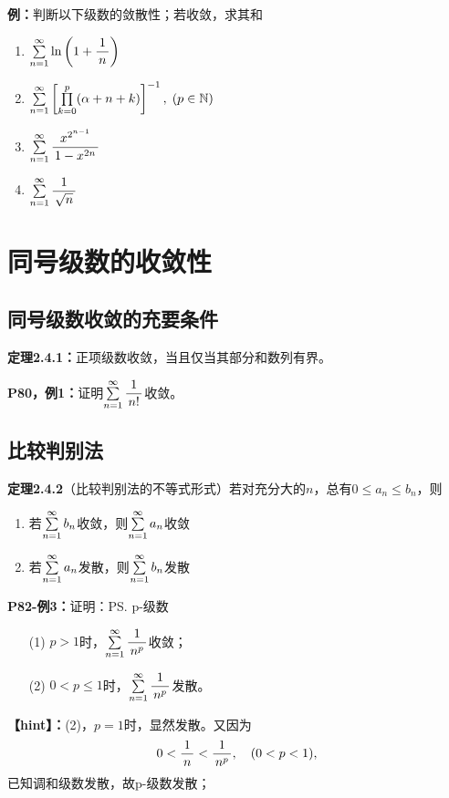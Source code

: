 {\bf 例：}判断以下级数的敛散性；若收敛，求其和

\begin{enumerate}[(1)]
  \setlength{\itemindent}{1cm}
  \item $\sumn\ln\left(1+\df 1n\right)$
  \item
  $\sumn\left[\prod\limits_{k=0}^p(\alpha+n+k)\right]^{-1},\;(p\in\mathbb{N})$
  \item $\sumn\df{x^{2^{n-1}}}{1-x^{2n}}$
  \item $\sumn\df{1}{\sqrt n}$
\end{enumerate}

\section{同号级数的收敛性}

\subsection{同号级数收敛的充要条件}

{\bf 定理2.4.1：}正项级数收敛，当且仅当其部分和数列有界。

{\bf P80，例1：}证明$\sumn\df1{n!}$收敛。

\subsection{比较判别法}

{\bf 定理2.4.2}（比较判别法的不等式形式）若对充分大的$n$，总有$0\leq a_n\leq b_n$，则
\begin{enumerate}
  \setlength{\itemindent}{1cm}
  \item 若$\sumn b_n$收敛，则$\sumn a_n$收敛
  \item 若$\sumn a_n$发散，则$\sumn b_n$发散
\end{enumerate}

{\bf P82-例3：}证明：\ps{p-级数}
\begin{enumerate}[(1)]
  \setlength{\itemindent}{1cm}
  \item[(1)] $p>1$时，$\sumn\df1{n^p}$收敛；
  \item[(2)] $0<p\leq 1$时，$\sumn\df1{n^p}$发散。
\end{enumerate}

{\bf 【hint】：}(2)，$p=1$时，显然发散。又因为
$$0<\df 1n<\df 1{n^p},\quad (0<p<1),$$
已知调和级数发散，故p-级数发散；

